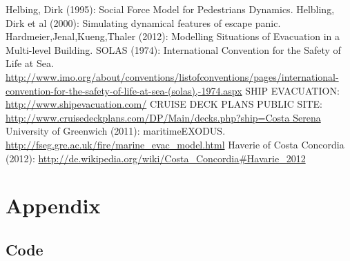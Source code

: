 \documentclass[11pt]{article}
\begin{document}
\begin{thebibliography}{9}
 Helbing, Dirk (1995): Social Force Model for Pedestrians Dynamics.
 Helbling, Dirk et al (2000): Simulating dynamical features of escape panic.
 Hardmeier,Jenal,Kueng,Thaler (2012): Modelling Situations of Evacuation in a Multi-level Building.
 SOLAS (1974): International Convention for the Safety of Life at Sea. \url{http://www.imo.org/about/conventions/listofconventions/pages/international-convention-for-the-safety-of-life-at-sea-(solas),-1974.aspx}
 SHIP EVACUATION: \url{http://www.shipevacuation.com/}
 CRUISE DECK PLANS PUBLIC SITE: \url{http://www.cruisedeckplans.com/DP/Main/decks.php?ship=Costa Serena}
 University of Greenwich (2011):  maritimeEXODUS. \url{http://fseg.gre.ac.uk/fire/marine_evac_model.html}
 Haverie of Costa Concordia (2012): \url{http://de.wikipedia.org/wiki/Costa_Concordia#Havarie_2012}
	
\end{thebibliography}
\section{Appendix}

\subsection{Code}


\end{document}
